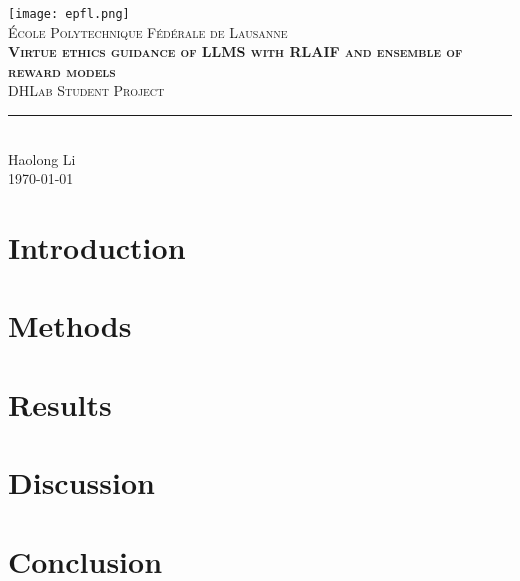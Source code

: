 \documentclass[11pt,titlepage]{report}
\begin{document}
\begin{titlepage}
	\centering
    \texttt{[image: epfl.png]}\\[0.25cm] 	%
    \textsc{\LARGE École Polytechnique Fédérale de Lausanne}\\ \vspace{\fill}
    \textbf{\textsc{\fontsize{50}{50}\selectfont Virtue ethics guidance of
LLMS with RLAIF and
ensemble of reward models}}\\ \vspace{\fill}		
	\textsc{\LARGE DHLab Student Project}\\[0.4cm]
	\rule{\linewidth}{0.2 mm} \\[0.5 cm]
	Haolong Li \\[2cm] \today
\end{titlepage}
\restoregeometry





\chapter{Introduction}


\chapter{Methods}


\chapter{Results}


\chapter{Discussion}


\chapter{Conclusion}


\clearpage
\pagestyle{numberonly}
\printbibliography
\end{document}
